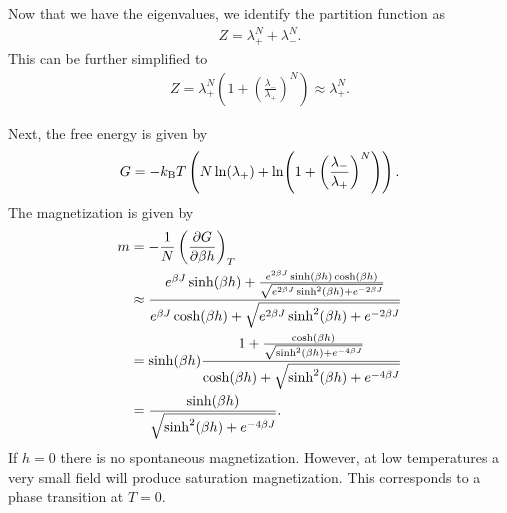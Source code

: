 Now that we have the eigenvalues, we identify the partition function as
\begin{align*}
	Z = \lambda_{+}^{N} + \lambda_{-}^{N}.
\end{align*}
This can be further simplified to
\begin{align*}
	Z = \lambda_{+}^{N}\left(1 + \left(\frac{\lambda_{-}}{\lambda_{+}}\right)^{N}\right) \approx \lambda_{+}^{N}.
\end{align*}

Next, the free energy is given by
\begin{align*}
	G = -k_{\text{B}} T\left(N\ln(\lambda_{+}) + \ln(1 + \left(\frac{\lambda_{-}}{\lambda_{+}}\right)^{N})\right).
\end{align*}
The magnetization is given by
\begin{align*}
	m &= -\frac{1}{N}\left(\pdv{G}{\beta h}\right)_{T} \\
	  &\approx \frac{e^{\beta J}\sinh(\beta h) + \frac{e^{2\beta J}\sinh(\beta h)\cosh(\beta h)}{\sqrt{e^{2\beta J}\sinh[2](\beta h) + e^{-2\beta J}}}}{e^{\beta J}\cosh(\beta h) + \sqrt{e^{2\beta J}\sinh[2](\beta h) + e^{-2\beta J}}} \\
	  &= \sinh(\beta h)\frac{1 + \frac{\cosh(\beta h)}{\sqrt{\sinh[2](\beta h) + e^{-4\beta J}}}}{\cosh(\beta h) + \sqrt{\sinh[2](\beta h) + e^{-4\beta J}}} \\
	  &= \frac{\sinh(\beta h)}{\sqrt{\sinh[2](\beta h) + e^{-4\beta J}}}.
\end{align*}
If $h = 0$ there is no spontaneous magnetization. However, at low temperatures a very small field will produce saturation magnetization. This corresponds to a phase transition at $T = 0$.

